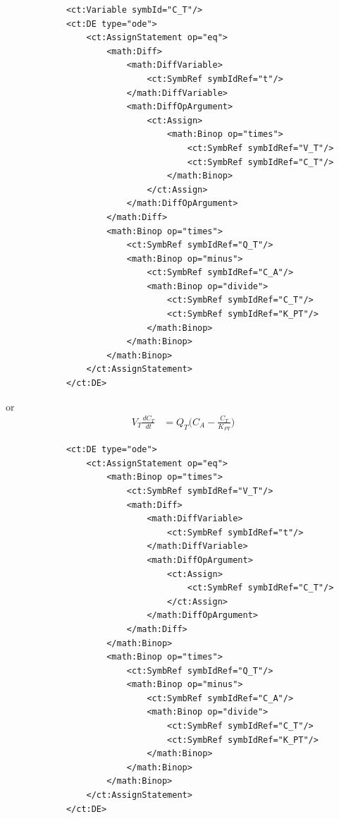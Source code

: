 \lstset{language=XML}
\begin{lstlisting}
            <ct:Variable symbId="C_T"/>
            <ct:DE type="ode">
                <ct:AssignStatement op="eq">
                    <math:Diff>
                        <math:DiffVariable>
                            <ct:SymbRef symbIdRef="t"/>
                        </math:DiffVariable>
                        <math:DiffOpArgument>
                            <ct:Assign>
                                <math:Binop op="times">
                                    <ct:SymbRef symbIdRef="V_T"/>
                                    <ct:SymbRef symbIdRef="C_T"/>
                                </math:Binop>
                            </ct:Assign>
                        </math:DiffOpArgument>
                    </math:Diff>
                    <math:Binop op="times">
                        <ct:SymbRef symbIdRef="Q_T"/>
                        <math:Binop op="minus">
                            <ct:SymbRef symbIdRef="C_A"/>
                            <math:Binop op="divide">
                                <ct:SymbRef symbIdRef="C_T"/>
                                <ct:SymbRef symbIdRef="K_PT"/>
                            </math:Binop>
                        </math:Binop>
                    </math:Binop>
                </ct:AssignStatement>
            </ct:DE>
\end{lstlisting}

or
\begin{align}
V_T \frac{dC_T}{dt} &= Q_T \Big(C_A - \frac{C_T}{K_{PT}}\Big) \nonumber 
\end{align}

\lstset{language=XML}
\begin{lstlisting}
            <ct:DE type="ode">
                <ct:AssignStatement op="eq">
                    <math:Binop op="times">
                        <ct:SymbRef symbIdRef="V_T"/>
                        <math:Diff>
                            <math:DiffVariable>
                                <ct:SymbRef symbIdRef="t"/>
                            </math:DiffVariable>
                            <math:DiffOpArgument>
                                <ct:Assign>
                                    <ct:SymbRef symbIdRef="C_T"/>
                                </ct:Assign>
                            </math:DiffOpArgument>
                        </math:Diff>
                    </math:Binop>
                    <math:Binop op="times">
                        <ct:SymbRef symbIdRef="Q_T"/>
                        <math:Binop op="minus">
                            <ct:SymbRef symbIdRef="C_A"/>
                            <math:Binop op="divide">
                                <ct:SymbRef symbIdRef="C_T"/>
                                <ct:SymbRef symbIdRef="K_PT"/>
                            </math:Binop>
                        </math:Binop>
                    </math:Binop>
                </ct:AssignStatement>
            </ct:DE>
\end{lstlisting}

